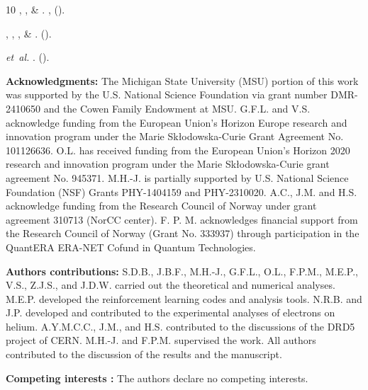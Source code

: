 \documentclass[fleqn,10pt]{wlscirep}
\begin{document}
\begin{thebibliography}{10}
, ,
   \& 
\newblock {}.
 \textbf{},
   ().

, ,
  ,  \&
\newblock {}.
  ().

 \emph{et~al.}
\newblock {}.
  \textbf{} ().

\end{thebibliography}


%

\medskip
\noindent \textbf{Acknowledgments:}
The Michigan State University (MSU) portion of this work was supported by the U.S. National Science Foundation via grant number DMR-2410650 and the Cowen Family Endowment at MSU. G.F.L. and V.S. acknowledge funding from the European Union’s Horizon Europe research and innovation program under the Marie
Skłodowska-Curie Grant Agreement No. 101126636. O.L. has received funding from the European Union's Horizon 2020 research and
innovation program under the Marie Skłodowska-Curie grant agreement No. 945371. M.H.-J. is partially supported by U.S. National Science Foundation (NSF) Grants PHY-1404159 and PHY-2310020. A.C., J.M. and H.S. acknowledge funding from the Research Council of Norway under grant agreement 310713 (NorCC center). F. P. M. acknowledges financial support from the Research Council of
Norway (Grant No. 333937) through participation in the QuantERA ERA-NET Cofund in Quantum Technologies.

\medskip
\noindent \textbf{Authors contributions:}
S.D.B., J.B.F., M.H.-J., G.F.L., O.L., F.P.M., M.E.P., V.S., Z.J.S., and J.D.W. carried out the theoretical and numerical analyses. M.E.P. developed the reinforcement learning codes and analysis tools. N.R.B. and J.P.  developed and contributed to the experimental  analyses of electrons on helium. A.Y.M.C.C., J.M., and H.S. contributed to the discussions of the DRD5 project of CERN. M.H.-J. and F.P.M. supervised the work. All authors contributed to the discussion of the results and the manuscript.

\medskip
\noindent \textbf{Competing interests :}
The authors declare no competing interests.
\end{document}
